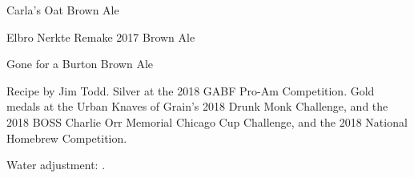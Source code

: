 \begin{recipe}{Carla's Oat Brown Ale}
\begin{recipe}{Elbro Nerkte Remake 2017 Brown Ale}
\end{recipe}

\begin{recipe}{Gone for a Burton Brown Ale}

\begin{aboutblock}
Recipe by Jim Todd. Silver at the 2018 GABF Pro-Am Competition. Gold medals
at the Urban Knaves of Grain's 2018 Drunk Monk Challenge, and the 2018 BOSS
Charlie Orr Memorial Chicago Cup Challenge, and the 2018 National Homebrew
Competition. 
\sourceaha
\end{aboutblock}


\begin{methodandtiming}

\begin{mashsteps}
\end{mashsteps}

\begin{fermentationsteps}
\end{fermentationsteps}

\begin{directions}
Water adjustment: .
\end{directions}

\end{methodandtiming}

\recipebreak

\begin{ingredientsblock}

\begin{malts}
\end{malts}

\begin{hops}
\end{hops}



\end{ingredientsblock}
\end{recipe}
\end{recipe}
